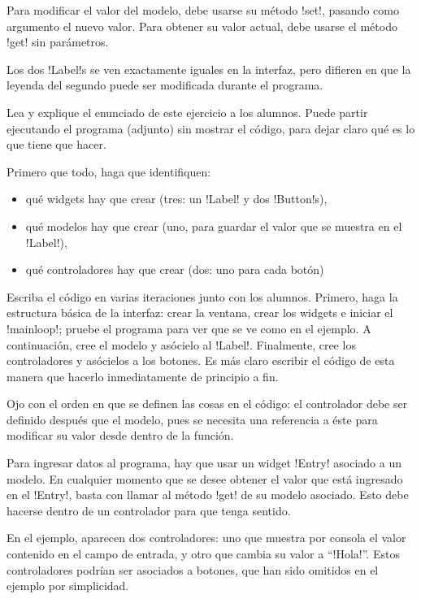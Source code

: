 \documentclass[10pt]{article}
\begin{document}
  Para modificar el valor del modelo,
  debe usarse su método \li!set!,
  pasando como argumento el nuevo valor.
  Para obtener su valor actual,
  debe usarse el método \li!get! sin parámetros.

  Los dos \li!Label!s se ven exactamente iguales en la interfaz,
  pero difieren en que la leyenda del segundo puede ser modificada
  durante el programa.


  Lea y explique el enunciado de este ejercicio a los alumnos.
  Puede partir ejecutando el programa (adjunto)
  sin mostrar el código,
  para dejar claro qué es lo que tiene que hacer.

  Primero que todo,
  haga que identifiquen:
  \begin{itemize}
    \item qué widgets hay que crear
      (tres: un \li!Label! y dos \li!Button!s),
    \item qué modelos hay que crear
      (uno, para guardar el valor que se muestra en el \li!Label!),
    \item qué controladores hay que crear
      (dos: uno para cada botón)
  \end{itemize}

  Escriba el código en varias iteraciones
  junto con los alumnos.
  Primero,
  haga la estructura básica de la interfaz:
  crear la ventana, crear los widgets e iniciar el \li!mainloop!;
  pruebe el programa para ver que se ve como en el ejemplo.
  A continuación,
  cree el modelo
  y asócielo al \li!Label!.
  Finalmente,
  cree los controladores
  y asócielos a los botones.
  Es más claro escribir el código de esta manera
  que hacerlo inmediatamente de principio a fin.

  Ojo con el orden en que se definen las cosas en el código:
  el controlador debe ser definido después que el modelo,
  pues se necesita una referencia a éste para modificar su valor
  desde dentro de la función.


  Para ingresar datos al programa,
  hay que usar un widget \li!Entry! asociado a un modelo.
  En cualquier momento que se desee obtener el valor
  que está ingresado en el \li!Entry!,
  basta con llamar al método \li!get! de su modelo asociado.
  Esto debe hacerse dentro de un controlador para que tenga sentido.

  En el ejemplo,
  aparecen dos controladores:
  uno que muestra por consola el valor contenido en el campo de entrada,
  y otro que cambia su valor a ``\li!Hola!''.
  Estos controladores podrían ser asociados a botones,
  que han sido omitidos en el ejemplo por simplicidad.
\end{document}
